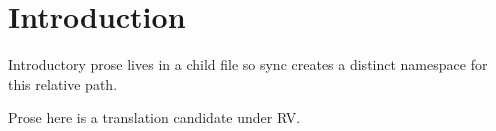 \section{Introduction}
\label{sec:intro}

Introductory prose lives in a child file so sync creates a distinct namespace
for this relative path.

Prose here is a translation candidate under RV.
